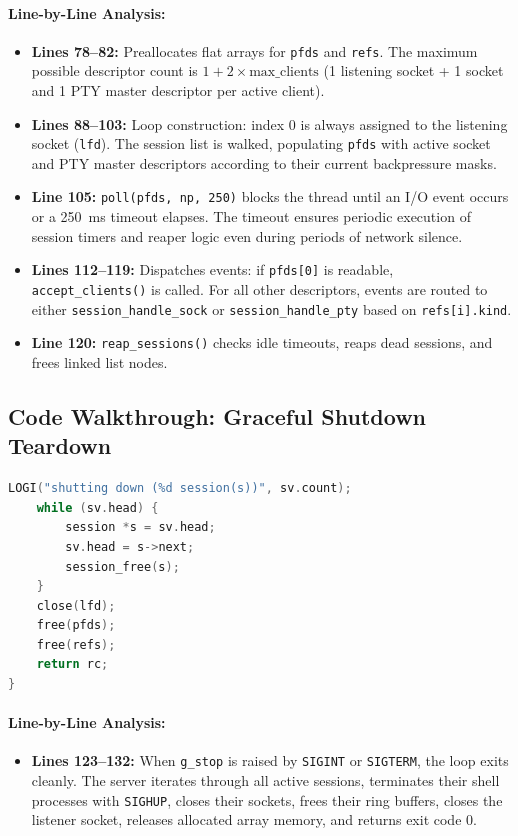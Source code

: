 \paragraph{Line-by-Line Analysis:}
\begin{itemize}[leftmargin=1.5em]
    \item \textbf{Lines 78--82:} Preallocates flat arrays for \texttt{pfds} and \texttt{refs}. The maximum possible descriptor count is $1 + 2 \times \text{max\_clients}$ (1 listening socket + 1 socket and 1 PTY master descriptor per active client).
    \item \textbf{Lines 88--103:} Loop construction: index 0 is always assigned to the listening socket (\texttt{lfd}). The session list is walked, populating \texttt{pfds} with active socket and PTY master descriptors according to their current backpressure masks.
    \item \textbf{Line 105:} \texttt{poll(pfds, np, 250)} blocks the thread until an I/O event occurs or a 250~ms timeout elapses. The timeout ensures periodic execution of session timers and reaper logic even during periods of network silence.
    \item \textbf{Lines 112--119:} Dispatches events: if \texttt{pfds[0]} is readable, \texttt{accept\_clients()} is called. For all other descriptors, events are routed to either \texttt{session\_handle\_sock} or \texttt{session\_handle\_pty} based on \texttt{refs[i].kind}.
    \item \textbf{Line 120:} \texttt{reap\_sessions()} checks idle timeouts, reaps dead sessions, and frees linked list nodes.
\end{itemize}

\subsection{Code Walkthrough: Graceful Shutdown Teardown}

\begin{lstlisting}[language=C]
    LOGI("shutting down (%d session(s))", sv.count);
    while (sv.head) {
        session *s = sv.head;
        sv.head = s->next;
        session_free(s);
    }
    close(lfd);
    free(pfds);
    free(refs);
    return rc;
}
\end{lstlisting}

\paragraph{Line-by-Line Analysis:}
\begin{itemize}[leftmargin=1.5em]
    \item \textbf{Lines 123--132:} When \texttt{g\_stop} is raised by \texttt{SIGINT} or \texttt{SIGTERM}, the loop exits cleanly. The server iterates through all active sessions, terminates their shell processes with \texttt{SIGHUP}, closes their sockets, frees their ring buffers, closes the listener socket, releases allocated array memory, and returns exit code 0.
\end{itemize}
